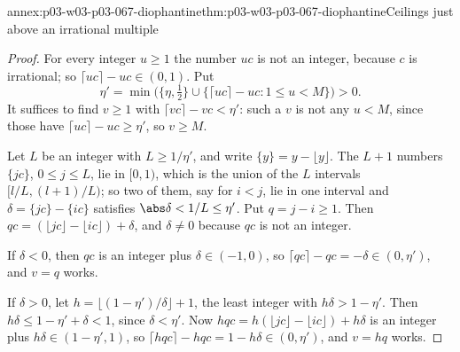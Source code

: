 \begin{annexitem}{annex:p03-w03-p03-067-diophantine}{thm:p03-w03-p03-067-diophantine}{Ceilings just above an irrational multiple}
\begin{proof}
For every integer \(u\geq1\) the number \(uc\) is not an integer, because
\(c\) is irrational; so \(\lceil uc\rceil-uc\in(0,1)\).  Put
\[
 \eta'=\min\bigl(\{\eta,\tfrac12\}\cup\{\lceil uc\rceil-uc:1\leq u<M\}\bigr)>0.
\]
It suffices to find \(v\geq1\) with \(\lceil vc\rceil-vc<\eta'\): such a
\(v\) is not any \(u<M\), since those have \(\lceil uc\rceil-uc\geq\eta'\),
so \(v\geq M\).

Let \(L\) be an integer with \(L\geq1/\eta'\), and write \(\{y\}=y-\lfloor
y\rfloor\).  The \(L+1\) numbers \(\{jc\}\), \(0\leq j\leq L\), lie in
\([0,1)\), which is the union of the \(L\) intervals
\([l/L,(l+1)/L)\); so two of them, say for \(i<j\), lie in one interval and
\(\delta=\{jc\}-\{ic\}\) satisfies \(\abs\delta<1/L\leq\eta'\).  Put
\(q=j-i\geq1\).  Then \(qc=(\lfloor jc\rfloor-\lfloor ic\rfloor)+\delta\),
and \(\delta\neq0\) because \(qc\) is not an integer.

If \(\delta<0\), then \(qc\) is an integer plus \(\delta\in(-1,0)\), so
\(\lceil qc\rceil-qc=-\delta\in(0,\eta')\), and \(v=q\) works.

If \(\delta>0\), let \(h=\lfloor(1-\eta')/\delta\rfloor+1\), the least
integer with \(h\delta>1-\eta'\).  Then
\(h\delta\leq1-\eta'+\delta<1\), since \(\delta<\eta'\).  Now
\(hqc=h(\lfloor jc\rfloor-\lfloor ic\rfloor)+h\delta\) is an integer plus
\(h\delta\in(1-\eta',1)\), so
\(\lceil hqc\rceil-hqc=1-h\delta\in(0,\eta')\), and \(v=hq\) works.
\end{proof}
\end{annexitem}

